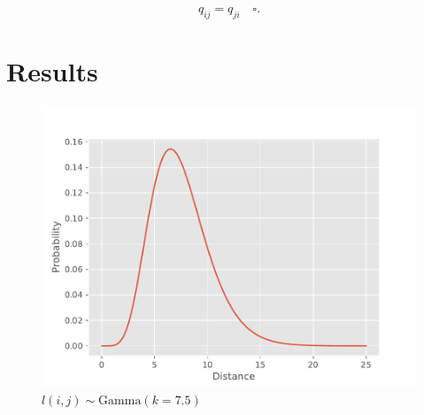\documentclass[6pt,oneside]{article}
\begin{document}
$$
q_{ij} = q_{ji}\quad\square.
$$







\section{Results}

\begin{figure}[h]
    \center
    \caption{$l(i,j) \sim \mathrm{Gamma}(k=7.5)$}
    \includegraphics[scale=0.8]{../src/fig1.pdf}
\end{figure}
\end{document}
